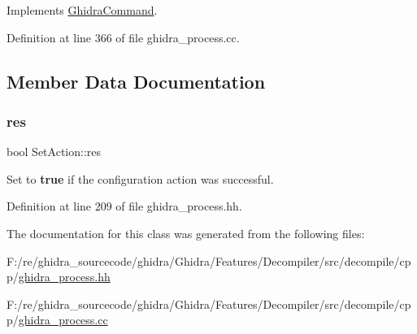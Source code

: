 Implements \mbox{\hyperlink{class_ghidra_command_a7d1a5cfedfd8f1d05161d27627302716}{Ghidra\+Command}}.



Definition at line 366 of file ghidra\+\_\+process.\+cc.



\subsection{Member Data Documentation}
\mbox{\label{class_set_action_ae5987516b802495e4367f41b038d1d2d}} 
\subsubsection{\texorpdfstring{res}{res}}
{\footnotesize\ttfamily bool Set\+Action\+::res}



Set to {\bfseries{true}} if the configuration action was successful. 



Definition at line 209 of file ghidra\+\_\+process.\+hh.



The documentation for this class was generated from the following files\+:\begin{DoxyCompactItemize}
\item 
F\+:/re/ghidra\+\_\+sourcecode/ghidra/\+Ghidra/\+Features/\+Decompiler/src/decompile/cpp/\mbox{\hyperlink{ghidra__process_8hh}{ghidra\+\_\+process.\+hh}}\item 
F\+:/re/ghidra\+\_\+sourcecode/ghidra/\+Ghidra/\+Features/\+Decompiler/src/decompile/cpp/\mbox{\hyperlink{ghidra__process_8cc}{ghidra\+\_\+process.\+cc}}\end{DoxyCompactItemize}
